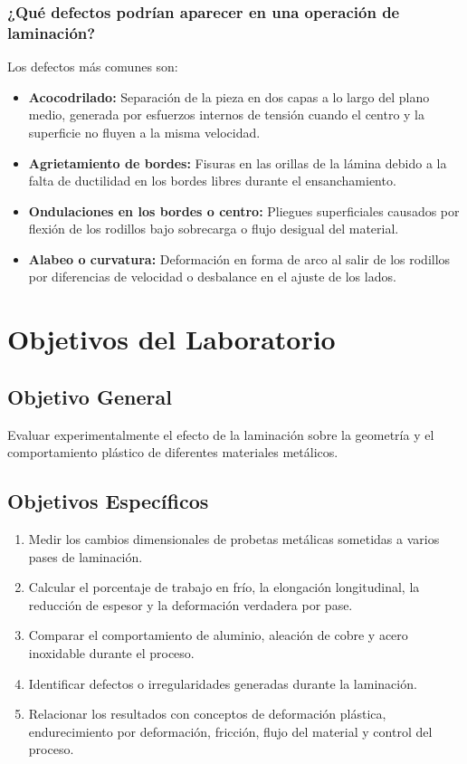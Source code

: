 \documentclass[journal]{IEEEtran}
\begin{document}
\subsubsection{¿Qué defectos podrían aparecer en una operación de laminación?}
Los defectos más comunes son:
\begin{itemize}
    \item \textbf{Acocodrilado:} Separación de la pieza en dos capas a lo largo del plano medio, generada por esfuerzos internos de tensión cuando el centro y la superficie no fluyen a la misma velocidad.
    \item \textbf{Agrietamiento de bordes:} Fisuras en las orillas de la lámina debido a la falta de ductilidad en los bordes libres durante el ensanchamiento.
    \item \textbf{Ondulaciones en los bordes o centro:} Pliegues superficiales causados por flexión de los rodillos bajo sobrecarga o flujo desigual del material.
    \item \textbf{Alabeo o curvatura:} Deformación en forma de arco al salir de los rodillos por diferencias de velocidad o desbalance en el ajuste de los lados.
\end{itemize}

\section{Objetivos del Laboratorio}

\subsection{Objetivo General}
Evaluar experimentalmente el efecto de la laminación sobre la geometría y el comportamiento plástico de diferentes materiales metálicos.

\subsection{Objetivos Específicos}
\begin{enumerate}
    \item Medir los cambios dimensionales de probetas metálicas sometidas a varios pases de laminación.
    \item Calcular el porcentaje de trabajo en frío, la elongación longitudinal, la reducción de espesor y la deformación verdadera por pase.
    \item Comparar el comportamiento de aluminio, aleación de cobre y acero inoxidable durante el proceso.
    \item Identificar defectos o irregularidades generadas durante la laminación.
    \item Relacionar los resultados con conceptos de deformación plástica, endurecimiento por deformación, fricción, flujo del material y control del proceso.
\end{enumerate}
\end{document}
